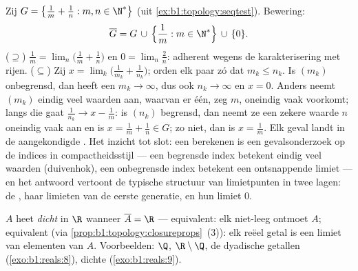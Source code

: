 \begin{example}\label{ex:b1:topology:closurecomputed}
Zij $G = \bigl\{\frac1m + \frac1n : m, n \in \N^*\bigr\}$ (uit
\cref{ex:b1:topology:seqtest}). Bewering:
\[
\overline G = G \,\cup\, \Bigl\{\frac1m : m \in \N^*\Bigr\}
\,\cup\, \{0\} .
\]
($\supseteq$) $\frac1m = \lim_n \bigl(\frac1m + \frac1n\bigr)$ en $0 =
\lim_n \frac2n$: adherent wegens de karakterisering met rijen.
($\subseteq$) Zij $x = \lim_k \bigl( \frac{1}{m_k} + \frac{1}{n_k}\bigr)$;
orden elk paar zó dat $m_k \leq n_k$. Is $(m_k)$ onbegrensd, dan heeft
een  $m_k \to \infty$, dus ook $n_k \to \infty$ en $x = 0$.
Anders neemt $(m_k)$ eindig veel waarden aan, waarvan er één, zeg $m$,
oneindig vaak voorkomt; langs die  gaat $\frac{1}{n_k} \to x -
\frac1m$: is $(n_k)$ begrensd, dan neemt ze een zekere waarde $n$
oneindig vaak aan en is $x = \frac1m + \frac1n \in G$; zo niet, dan is $x
= \frac1m$. Elk geval landt in de aangekondigde . Het inzicht
tot slot: een  berekenen is een gevalsonderzoek op de indices
in compactheidsstijl --- een begrensde index betekent eindig veel waarden
(duivenhok), een onbegrensde index betekent een ontsnappende limiet ---
en het antwoord vertoont de typische structuur van limietpunten in twee
lagen: de , haar limieten van de eerste generatie, en hun
limiet $0$.
\end{example}

\begin{definition}\label{def:b1:topology:dense}
$A$ heet \emph{dicht} in $\R$ wanneer $\overline A = \R$
--- equivalent: elk niet-leeg   ontmoet $A$; equivalent (via
\cref{prop:b1:topology:closureprops}~(3)): elk reëel getal is een limiet
van elementen van $A$. Voorbeelden: $\Q$, $\R \setminus \Q$, de dyadische
getallen (\cref{exo:b1:reals:8}), dichte 
(\cref{exo:b1:reals:9}).
\end{definition}

